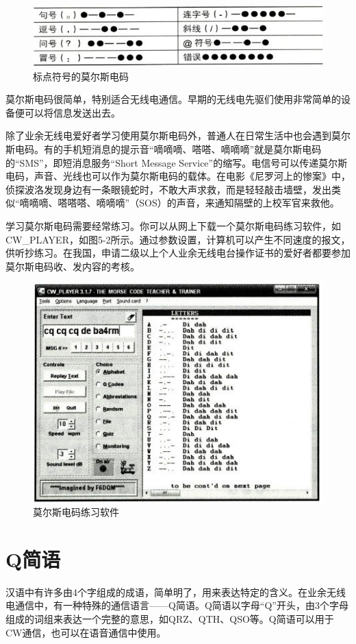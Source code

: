 \documentclass[12pt,UTF8]{ctexbook}
\begin{document}
\begin{figure}[htbp]
	\centering
	\includegraphics[width=0.7\linewidth]{62}
	\caption{标点符号的莫尔斯电码}
	\label{fig:1}
\end{figure}

莫尔斯电码很简单，特别适合无线电通信。早期的无线电先驱们使用非常简单的设备便可以将信息发送出去。

除了业余无线电爱好者学习使用莫尔斯电码外，普通人在日常生活中也会遇到莫尔斯电码。有的手机短消息的提示音“嘀嘀嘀、嗒嗒、嘀嘀嘀”就是莫尔斯电码的“SMS”，即短消息服务“Short Message Service”的缩写。电信号可以传递莫尔斯电码，声音、光线也可以作为莫尔斯电码的载体。在电影《尼罗河上的惨案》中，侦探波洛发现身边有一条眼镜蛇时，不敢大声求救，而是轻轻敲击墙壁，发出类似“嘀嘀嘀、嗒嗒嗒、嘀嘀嘀”（SOS）的声音，来通知隔壁的上校军官来救他。

学习莫尔斯电码需要经常练习。你可以从网上下载一个莫尔斯电码练习软件，如CW\_PLAYER，如图5-2所示。通过参数设置，计算机可以产生不同速度的报文，供听抄练习。在我国，申请二级以上个人业余无线电台操作证书的爱好者都要参加莫尔斯电码收、发内容的考核。

\begin{figure}[htbp]
	\centering
	\includegraphics[width=0.7\linewidth]{63}
	\caption{莫尔斯电码练习软件}
	\label{fig:1}
\end{figure}

\section{Q简语}

汉语中有许多由4个字组成的成语，简单明了，用来表达特定的含义。在业余无线电通信中，有一种特殊的通信语言——Q简语。Q简语以字母“Q”开头，由3个字母组成的词组来表达一个完整的意思，如QRZ、QTH、QSO等。Q简语可以用于CW通信，也可以在语音通信中使用。
\end{document}
